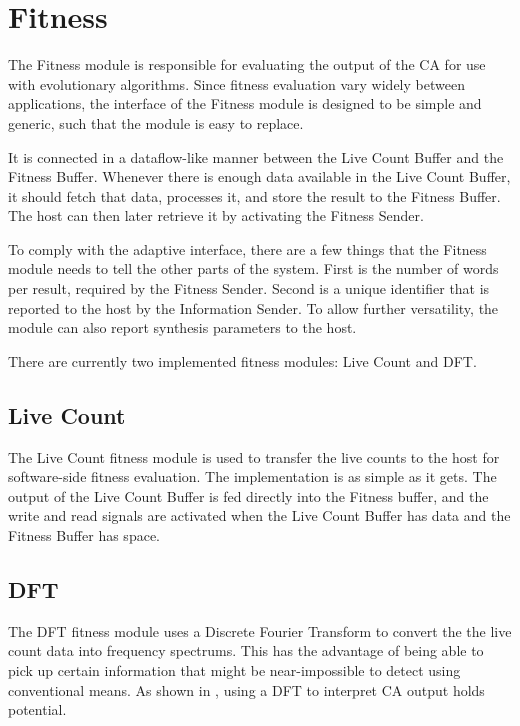
\section{Fitness}
\label{sec:fitness}

The Fitness module is responsible for evaluating the output of the CA for use with evolutionary algorithms.
Since fitness evaluation vary widely between applications, the interface of the Fitness module is designed to be simple and generic, such that the module is easy to replace.

It is connected in a dataflow-like manner between the Live Count Buffer and the Fitness Buffer.
Whenever there is enough data available in the Live Count Buffer, it should fetch that data, processes it, and store the result to the Fitness Buffer.
The host can then later retrieve it by activating the Fitness Sender.

To comply with the adaptive interface, there are a few things that the Fitness module needs to tell the other parts of the system.
First is the number of words per result, required by the Fitness Sender.
Second is a unique identifier that is reported to the host by the Information Sender.
To allow further versatility, the module can also report synthesis parameters to the host.

There are currently two implemented fitness modules: Live Count and DFT.

\subsection{Live Count}

The Live Count fitness module is used to transfer the live counts to the host for software-side fitness evaluation.
The implementation is as simple as it gets.
The output of the Live Count Buffer is fed directly into the Fitness buffer, and the write and read signals are activated when the Live Count Buffer has data and the Fitness Buffer has space.

\subsection{DFT}

The DFT fitness module uses a Discrete Fourier Transform to convert the the live count data into frequency spectrums.
This has the advantage of being able to pick up certain information that might be near-impossible to detect using conventional means.
As shown in , using a DFT to interpret CA output holds potential.

